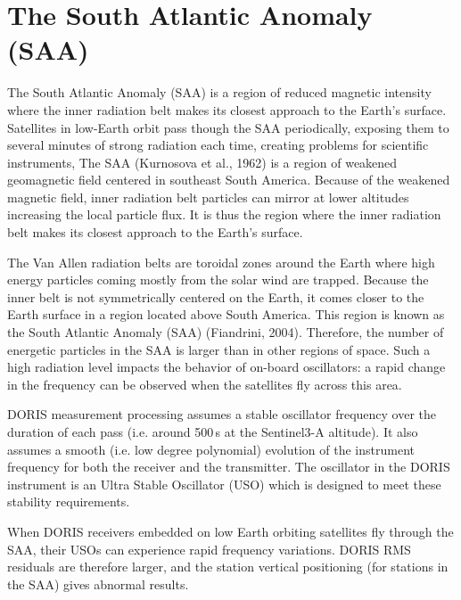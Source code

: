 \section{The South Atlantic Anomaly (SAA)}\label{sec:saa}

\iffalse
https://www.aviso.altimetry.fr/en/news/image-of-the-month/2007/oct-2007-south-atlantic-anomaly-as-seen-by-doris.html
https://ids-doris.org/images/documents/report/ids_workshop_2010/IDS10_s1_Stepanek_Spot5SAA.pdf
\fi

The South Atlantic Anomaly (SAA) is a region of reduced magnetic intensity where the inner radiation belt makes its closest approach to the Earth's surface. Satellites in low-Earth orbit pass though the SAA periodically, exposing them to several minutes of strong radiation each time, creating problems for scientific instruments,
The SAA (Kurnosova et al., 1962) is a region of weakened geomagnetic field centered in southeast South America. Because of the weakened magnetic field, inner radiation belt particles can mirror at lower altitudes increasing the local particle flux. It is thus the region where the inner radiation belt makes its closest approach to the Earth's surface. 

The Van Allen radiation belts are toroidal zones around the Earth where high energy particles coming mostly from the solar wind are trapped. Because the inner belt is not symmetrically centered on the Earth, it comes closer to the Earth surface in a region located above South America. This region is known as the South Atlantic Anomaly (SAA) (Fiandrini, 2004). Therefore, the number of energetic particles in the SAA is larger than in other regions of space. Such a high radiation level impacts the behavior of on-board oscillators: a rapid change in the frequency can be observed when the satellites fly across this area.

DORIS measurement processing assumes a stable oscillator frequency over the duration of each pass (i.e. around 500 s at the Sentinel3-A altitude). It also assumes a smooth (i.e. low degree polynomial) evolution of the instrument frequency for both the receiver and the transmitter. The oscillator in the DORIS instrument is an Ultra Stable Oscillator (USO) which is designed to meet these stability requirements.

When DORIS receivers embedded on low Earth orbiting satellites fly through the SAA, their USOs can experience rapid frequency variations. DORIS RMS residuals are therefore larger, and the station vertical positioning (for stations in the SAA) gives abnormal results.

